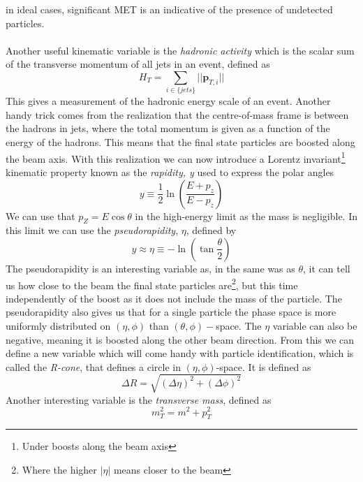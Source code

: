 \documentclass[12pt, a4paper]{book}
\begin{document}
in ideal cases, significant MET is an indicative of the presence of undetected particles. \\
\\Another useful kinematic variable is the \textit{hadronic activity} which is the scalar sum of the transverse momentum of all jets in an event, defined as
\begin{equation}\label{eq:HT}
    H_T = \sum_{i\in\{jets\}} \vert\vert \mathbf{p}_{T,i}\vert\vert
\end{equation}
This gives a measurement of the hadronic energy scale of an event. Another handy trick comes from the realization that the centre-of-mass frame is between the hadrons in jets, where the total momentum is given as a function of the energy of the hadrons. 
This means that the final state particles are boosted along the beam axis. With this realization we can now introduce a Lorentz invariant\footnote{Under boosts along the beam axis} kinematic property known as the \textit{rapidity, y} used to express the polar angles
\begin{equation}\label{eq:rapidity}
    y \equiv \frac{1}{2}\ln\left(\frac{E+p_z}{E-p_z}\right)  
\end{equation} 
We can use that $p_Z = E\cos\theta$ in the high-energy limit as the mass is negligible. In this limit we can use the \textit{pseudorapidity}, $\eta$, defined by
\begin{equation}\label{eq:pseudorapidity}
    y\approx \eta \equiv -\ln\left(\tan\frac{\theta}{2}\right)
\end{equation}
The pseudorapidity is an interesting variable as, in the same was as $\theta$, it can tell us how close to the beam the final state particles are\footnote{Where the higher $\vert\eta\vert$ means closer to the beam}, but this time independently of the boost as it does not include the mass of the particle. The
pseudorapidity also gives us that for a single particle the phase space is more uniformly distributed on $(\eta,\phi)$ than $(\theta,\phi)-$space. The $\eta$ variable can also be negative, meaning it is boosted along the other beam direction. 
From this we can define a new variable which will come handy with particle identification, which is called the \textit{R-cone}, that defines a circle in $(\eta,\phi)$-space. It is defined as
\begin{equation}\label{eq:R-cone}
    \Delta R = \sqrt{(\Delta\eta)^2+(\Delta\phi)^2}
\end{equation}
Another interesting variable is the \textit{transverse mass}, defined as
\begin{equation}\label{eq:transverse_mass}
    m_T^2 = m^2 + p_T^2
\end{equation}
\end{document}

